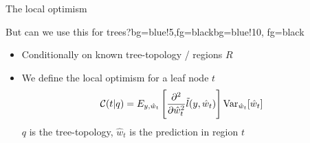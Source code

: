\begin{frame}{The local optimism}
	
				\begin{myblock}{But can we use this for trees?}{bg=blue!5,fg=black}{bg=blue!10, fg=black}
				\begin{itemize}
					\item<2-> Conditionally on known tree-topology / regions $R$
					\item<2-> We define the local optimism for a leaf node $t$
					\begin{align*}
						\mathcal{C}(t|q) &= 
						E_{y,\hat{w}_t} \left[ \frac{\partial^2}{\partial \hat{w}_t^2}\tilde l(y,\hat{w}_t)\right]
						\mathrm{Var}_{\hat{w}_t}[\hat{w}_{t}]
					\end{align*}
					$q$ is the tree-topology, $\hat{w}_t$ is the prediction in region $t$
				\end{itemize}
			\end{myblock}
		

\end{frame}

